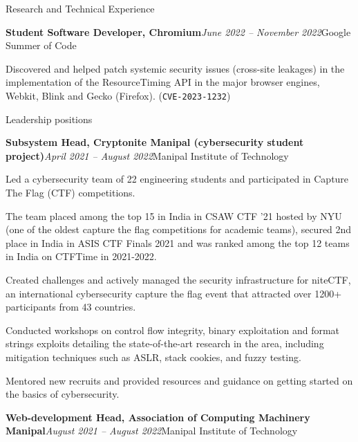 \documentclass{resume} %
\begin{document}
\begin{rSection}{Research and Technical Experience}
\begin{rSubsection}{\bf Student Software Developer, Chromium}{\em June 2022 -- November 2022}{Google Summer of Code}{}
\item Discovered and helped patch systemic security issues (cross-site leakages) in the implementation of the ResourceTiming API in the major browser engines, Webkit, Blink and Gecko (Firefox). (\texttt{CVE-2023-1232})
\end{rSubsection}
\begin{rSection}{Leadership positions}
\begin{rSubsection}{\bf Subsystem Head, Cryptonite Manipal (cybersecurity student project)}{\em April 2021 -- August 2022}{Manipal Institute of Technology}{}
\item Led a cybersecurity team of 22 engineering students and participated in Capture The Flag (CTF) competitions. 
\item The team placed among the top 15 in India in CSAW CTF '21 hosted by NYU (one of the oldest capture the flag competitions for academic teams), secured 2nd place in India in ASIS CTF Finals 2021 and was ranked among the top 12 teams in India on CTFTime in 2021-2022.
\item Created challenges and actively managed the security infrastructure for niteCTF, an international cybersecurity capture the flag event that attracted over 1200+ participants from 43 countries.
\item Conducted workshops on control flow integrity, binary exploitation and format strings exploits detailing the state-of-the-art research in the area, including mitigation techniques such as ASLR, stack cookies, and fuzzy testing.
\item Mentored new recruits and provided resources and guidance on getting started on the basics of cybersecurity.
\end{rSubsection}
\end{rSection}
\begin{rSubsection}{\bf Web-development Head, Association of Computing Machinery Manipal}{\em August 2021 -- August 2022}{Manipal Institute of Technology}{}

\end{rSubsection}
\end{rSection}
\end{document}
